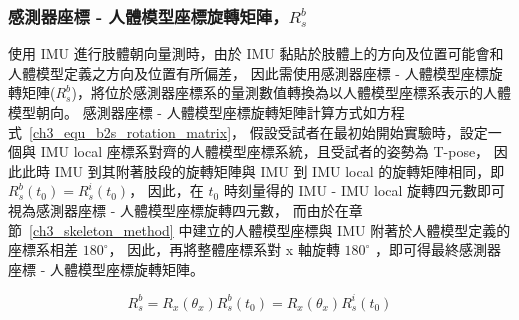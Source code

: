 \subsubsection{感測器座標 - 人體模型座標旋轉矩陣，$R^b_s$}
使用 IMU 進行肢體朝向量測時，由於 IMU 黏貼於肢體上的方向及位置可能會和人體模型定義之方向及位置有所偏差，
因此需使用感測器座標 - 人體模型座標旋轉矩陣($R^b_s$)，將位於感測器座標系的量測數值轉換為以人體模型座標系表示的人體模型朝向。
感測器座標 - 人體模型座標旋轉矩陣計算方式如方程式~\ref{ch3_equ_b2s_rotation_matrix}，
假設受試者在最初始開始實驗時，設定一個與 IMU local 座標系對齊的人體模型座標系統，且受試者的姿勢為 T-pose，
因此此時 IMU 到其附著肢段的旋轉矩陣與 IMU 到 IMU local 的旋轉矩陣相同，即 $R^{b}_{s}(t_0) = R^{i}_{s}(t_0)$，
因此，在 $t_0$ 時刻量得的 IMU - IMU local 旋轉四元數即可視為感測器座標 - 人體模型座標旋轉四元數，
而由於在章節~\ref{ch3_skeleton_method} 中建立的人體模型座標與 IMU 附著於人體模型定義的座標系相差 $180^{\circ}$，
因此，再將整體座標系對 x 軸旋轉 $180^{\circ}$ ，即可得最終感測器座標 - 人體模型座標旋轉矩陣。 

\begin{equation}
   R^{b}_{s} = R_{x}(\theta_{x})R^{b}_{s}(t_0) = R_{x}(\theta_{x})R^{i}_{s}(t_0)
   \label{ch3_equ_b2s_rotation_matrix}
\end{equation}


